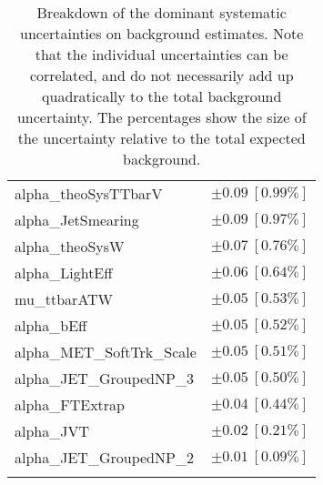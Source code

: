 \begin{table}
\begin{center}
\begin{tabular*}{\textwidth}{@{\extracolsep{\fill}}lc}
alpha\_theoSysTTbarV         & $\pm 0.09\ [0.99\%] $       \\
alpha\_JetSmearing         & $\pm 0.09\ [0.97\%] $       \\
alpha\_theoSysW         & $\pm 0.07\ [0.76\%] $       \\
alpha\_LightEff         & $\pm 0.06\ [0.64\%] $       \\
mu\_ttbarATW         & $\pm 0.05\ [0.53\%] $       \\
alpha\_bEff         & $\pm 0.05\ [0.52\%] $       \\
alpha\_MET\_SoftTrk\_Scale         & $\pm 0.05\ [0.51\%] $       \\
alpha\_JET\_GroupedNP\_3         & $\pm 0.05\ [0.50\%] $       \\
alpha\_FTExtrap         & $\pm 0.04\ [0.44\%] $       \\
alpha\_JVT         & $\pm 0.02\ [0.21\%] $       \\
alpha\_JET\_GroupedNP\_2         & $\pm 0.01\ [0.09\%] $       \\
\noalign{\smallskip}\hline\noalign{\smallskip}
\end{tabular*}
\end{center}
\caption[Breakdown of uncertainty on background estimates]{
Breakdown of the dominant systematic uncertainties on background estimates.
Note that the individual uncertainties can be correlated, and do not necessarily add up quadratically to 
the total background uncertainty. The percentages show the size of the uncertainty relative to the total expected background.
\label{table.results.bkgestimate.uncertainties.SRA_TW}}
\end{table}
%
